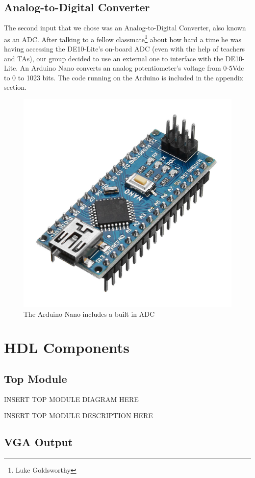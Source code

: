 \documentclass[a4paper]{article}
\begin{document}
\subsection{Analog-to-Digital Converter}
The second input that we chose was an Analog-to-Digital Converter, also known as an ADC. After talking to a fellow classmate\footnote{Luke Goldsworthy} about how hard a time he was having accessing the DE10-Lite's on-board ADC (even with the help of teachers and TAs), our group decided to use an external one to interface with the DE10-Lite. An Arduino Nano converts an analog potentiometer's voltage from 0-5Vdc  to 0 to 1023 bits. The code running on the Arduino is included in the appendix section. 

\begin{figure}[H]
    \includegraphics[width=0.6 \linewidth]{images/nano.jpg}
    \caption{The Arduino Nano includes a built-in ADC}
    \label{nano}
\end{figure}



\section{HDL Components}

\subsection{Top Module}

INSERT TOP MODULE DIAGRAM HERE

INSERT TOP MODULE DESCRIPTION HERE

\subsection{VGA Output}
\end{document}
